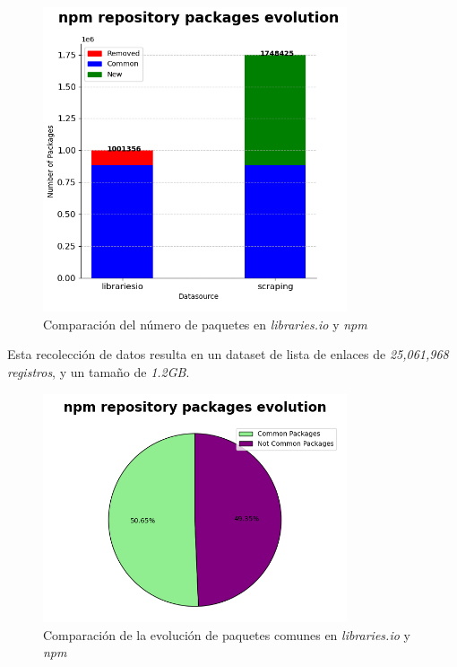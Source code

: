 \begin{figure}[ht!]
    \begin{center}
        \includegraphics[width=0.8\textwidth]{img/npm/bars.png}
        \caption{Comparación del número de paquetes en \textit{libraries.io} y \textit{npm}}
    \end{center}
    \label{fig:npm_bars}
\end{figure}

Esta recolección de datos resulta en un dataset de lista de enlaces de \textit{25,061,968 registros}, y un tamaño de \textit{1.2GB}.

\begin{figure}[ht!]
    \begin{center}
        \includegraphics[width=0.8\textwidth]{img/npm/circ.png}
        \caption{Comparación de la evolución de paquetes comunes en \textit{libraries.io} y \textit{npm}}
    \end{center}
    \label{fig:npm_circ}
\end{figure}


